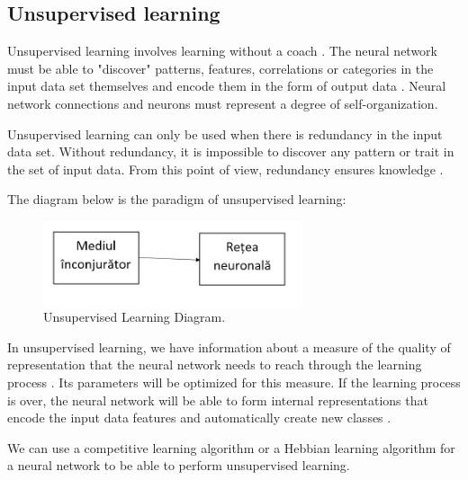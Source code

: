 \subsection{Unsupervised learning}

Unsupervised learning involves learning without a coach \cite{Girolami}. The neural network must be able to "discover" patterns, features, correlations or categories in the input data set themselves and encode them in the form of output data \cite{Sanger1, Sanger2}. Neural network connections and neurons must represent a degree of self-organization.

Unsupervised learning can only be used when there is redundancy in the input data set. Without redundancy, it is impossible to discover any pattern or trait in the set of input data. From this point of view, redundancy ensures knowledge \cite{Barlow}.

The diagram below is the paradigm of unsupervised learning:

\begin{figure}[H]
  \centering
  \includegraphics[width=3in]{images/diagramaInvNesupervizate.png}
  \caption {Unsupervised Learning Diagram.}
\end{figure}

In unsupervised learning, we have information about a measure of the quality of representation that the neural network needs to reach through the learning process \cite{Diamantaras}. Its parameters will be optimized for this measure. If the learning process is over, the neural network will be able to form internal representations that encode the input data features and automatically create new classes \cite{Diamantaras}.

We can use a competitive learning algorithm or a Hebbian learning algorithm for a neural network to be able to perform unsupervised learning.